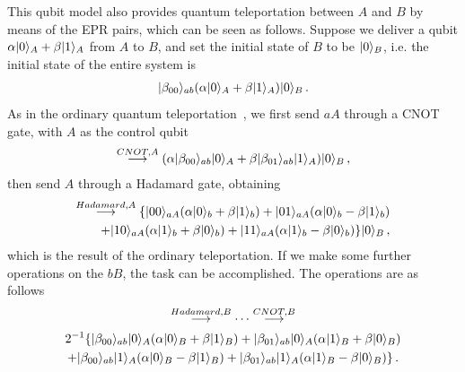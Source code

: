 \documentclass[12pt,a4paper]{article}
\begin{document}
This qubit model also provides quantum teleportation between $A$ and $B$ by means of the EPR pairs, which can be seen as follows. Suppose we deliver a qubit $\alpha\arrowvert
0\rangle_A+\beta\arrowvert 1\rangle_A$ from $A$ to $B$, and set the initial state of $B$ to be $\arrowvert
0\rangle_B$, i.e. the initial state of the entire system is
\begin{equation}
\label{eq:122}
\begin{split}
\arrowvert\beta_{00}\rangle_{ab}(\alpha\arrowvert
0\rangle_A+\beta\arrowvert 1\rangle_A)\arrowvert 0\rangle_B \,.
\end{split}
\end{equation}
As in the ordinary quantum teleportation~\cite{n,o}, we first send $aA$ through a CNOT gate, with $A$ as the control qubit
\begin{equation}
\label{eq:122a}
\begin{split}
\stackrel{CNOT,A}{\longrightarrow}(\alpha\arrowvert\beta_{00}\rangle_{ab}\arrowvert
0\rangle_A+\beta\arrowvert\beta_{01}\rangle_{ab}\arrowvert 1\rangle_A)\arrowvert 0\rangle_B \,,
\end{split}
\end{equation}
then send $A$ through a Hadamard gate, obtaining
\begin{equation}
\label{eq:122b}
\begin{split}
\stackrel{Hadamard,A}{\longrightarrow}\{\arrowvert00\rangle_{aA}(\alpha\arrowvert
0\rangle_b+\beta\arrowvert 1\rangle_b)+\arrowvert01\rangle_{aA}(\alpha\arrowvert
0\rangle_b-\beta\arrowvert 1\rangle_b)\\+\arrowvert10\rangle_{aA}(\alpha\arrowvert
1\rangle_b+\beta\arrowvert 0\rangle_b)+\arrowvert11\rangle_{aA}(\alpha\arrowvert
1\rangle_b-\beta\arrowvert 0\rangle_b)\}\arrowvert 0\rangle_B \,,
\end{split}
\end{equation}
which is the result of the ordinary teleportation. If we make some further operations on the $bB$, the task can be accomplished. The operations are as follows
\begin{multline}
\label{eq:122c}
\stackrel{Hadamard,B}{\longrightarrow}\cdots\stackrel{CNOT,B}{\longrightarrow}\\
2^{-1}\{\arrowvert\beta_{00}\rangle_{ab}\arrowvert 0\rangle_A(\alpha\arrowvert
0\rangle_B+\beta\arrowvert 1\rangle_B)+\arrowvert\beta_{01}\rangle_{ab}\arrowvert 0\rangle_A(\alpha\arrowvert
1\rangle_B+\beta\arrowvert 0\rangle_B)\\
+\arrowvert\beta_{00}\rangle_{ab}\arrowvert 1\rangle_A(\alpha\arrowvert
0\rangle_B-\beta\arrowvert 1\rangle_B)+\arrowvert\beta_{01}\rangle_{ab}\arrowvert 1\rangle_A(\alpha\arrowvert
1\rangle_B-\beta\arrowvert 0\rangle_B)\} \,.
\end{multline}
\end{document}
